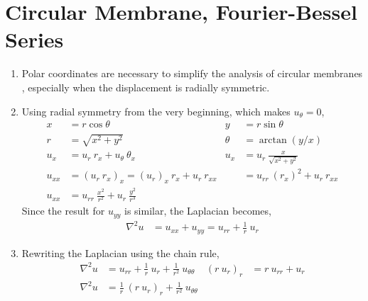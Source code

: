 \section{Circular Membrane, Fourier-Bessel Series}

\begin{enumerate}
    \item Polar coordinates are necessary to simplify the analysis of circular membranes
          , especially when the displacement is radially symmetric.

    \item Using radial symmetry from the very beginning, which makes $ u_\theta  = 0$,
          \begin{align}
              x      & = r\cos \theta                                   &
              y      & = r \sin \theta                                    \\
              r      & = \sqrt{x^2 + y^2}                               &
              \theta & = \arctan(y/x)                                     \\
              u_x    & = u_r\ r_x + u_\theta\ \theta_x                  &
              u_x    & = u_r\ \frac{x}{\sqrt{x^2 + y^2}}                  \\
              u_{xx} & = (u_r\ r_x)_x = (u_r)_x\ r_x + u_r\ r_{xx}      &
                     & = u_{rr}\ (r_x)^2 + u_r\ r_{xx}                    \\
              u_{xx} & = u_{rr}\ \frac{x^2}{r^2} + u_r\ \frac{y^2}{r^3}
          \end{align}
          Since the result for $ u_{yy} $ is similar, the Laplacian becomes,
          \begin{align}
              \nabla^2 u & = u_{xx} + u_{yy} = u_{rr} + \frac{1}{r}\ u_r
          \end{align}

    \item Rewriting the Laplacian using the chain rule,
          \begin{align}
              \nabla^2 u                         & = u_{rr} + \frac{1}{r}\ u_r
              + \frac{1}{r^2} \ u_{\theta\theta} &
              (r\ u_r)_r                         & = r\ u_{rr} + u_r           \\
              \nabla^2 u                         & = \frac{1}{r}\ (r\ u_r)_r
              + \frac{1}{r^2}\ u_{\theta\theta}  &
          \end{align}


\end{enumerate}
